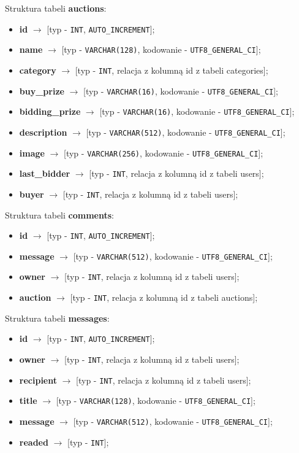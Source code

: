 \documentclass[a4paper]{article}
\begin{document}
	\vspace{0.5cm}
	Struktura tabeli \textbf{auctions}:
	\begin{itemize}
		\item \textbf{id} $\to$ [typ - \verb|INT|, \verb|AUTO_INCREMENT|];
		\item \textbf{name} $\to$ [typ - \verb|VARCHAR(128)|, kodowanie - \verb|UTF8_GENERAL_CI|];
		\item \textbf{category} $\to$ [typ - \verb|INT|, relacja z kolumną id z tabeli categories];
		\item \textbf{buy\_prize} $\to$ [typ - \verb|VARCHAR(16)|, kodowanie - \verb|UTF8_GENERAL_CI|];
		\item \textbf{bidding\_prize} $\to$ [typ - \verb|VARCHAR(16)|, kodowanie - \verb|UTF8_GENERAL_CI|];
		\item \textbf{description} $\to$ [typ - \verb|VARCHAR(512)|, kodowanie - \verb|UTF8_GENERAL_CI|];
		\item \textbf{image} $\to$ [typ - \verb|VARCHAR(256)|, kodowanie - \verb|UTF8_GENERAL_CI|];
		\item \textbf{last\_bidder} $\to$ [typ - \verb|INT|, relacja z kolumną id z tabeli users];
		\item \textbf{buyer} $\to$ [typ - \verb|INT|, relacja z kolumną id z tabeli users];
	\end{itemize}

	\vspace{0.5cm}
	Struktura tabeli \textbf{comments}:
	\begin{itemize}
		\item \textbf{id} $\to$ [typ - \verb|INT|, \verb|AUTO_INCREMENT|];
		\item \textbf{message} $\to$ [typ - \verb|VARCHAR(512)|, kodowanie - \verb|UTF8_GENERAL_CI|];
		\item \textbf{owner} $\to$ [typ - \verb|INT|, relacja z kolumną id z tabeli users];
		\item \textbf{auction} $\to$ [typ - \verb|INT|, relacja z kolumną id z tabeli auctions];
	\end{itemize}

	\vspace{0.5cm}
	Struktura tabeli \textbf{messages}:
	\begin{itemize}
		\item \textbf{id} $\to$ [typ - \verb|INT|, \verb|AUTO_INCREMENT|];
		\item \textbf{owner} $\to$ [typ - \verb|INT|, relacja z kolumną id z tabeli users];
		\item \textbf{recipient} $\to$ [typ - \verb|INT|, relacja z kolumną id z tabeli users];
		\item \textbf{title} $\to$ [typ - \verb|VARCHAR(128)|, kodowanie - \verb|UTF8_GENERAL_CI|];
		\item \textbf{message} $\to$ [typ - \verb|VARCHAR(512)|, kodowanie - \verb|UTF8_GENERAL_CI|];
		\item \textbf{readed} $\to$ [typ - \verb|INT|];
	\end{itemize} 
	
\end{document}
